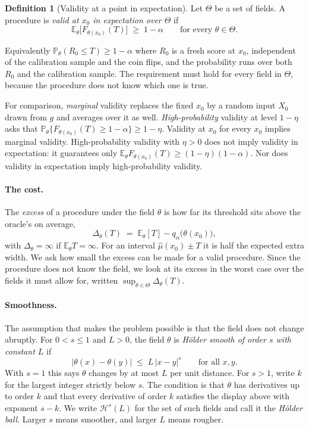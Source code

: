 \documentclass[11pt]{article}
\theoremstyle{definition}
\newtheorem{definition}[theorem]{Definition}
\theoremstyle{remark}
\newcommand{\E}{\mathbb{E}}
\newcommand{\Prob}{\mathbb{P}}
\begin{document}
\begin{definition}[Validity at a point in expectation]\label{def:valid}
Let $\Theta$ be a set of fields. A procedure is \emph{valid at $x_0$ in expectation over
$\Theta$} if
\begin{equation}\label{eq:valid}
  \E_\theta\big[F_{\theta(x_0)}(T)\big]\;\ge\;1-\alpha
  \qquad\text{for every }\theta\in\Theta .
\end{equation}
\end{definition}

Equivalently $\Prob_\theta(R_0\le T)\ge1-\alpha$ where $R_0$ is a fresh score at $x_0$,
independent of the calibration sample and the coin flips, and
the probability runs over both $R_0$ and the calibration sample. The requirement must hold
for every field in $\Theta$, because the procedure does not know which one is true.

For comparison, \emph{marginal} validity replaces the fixed $x_0$ by a random input $X_0$
drawn from $g$ and averages over it as well. \emph{High-probability} validity at level
$1-\eta$ asks that $\Prob_\theta\{F_{\theta(x_0)}(T)\ge1-\alpha\}\ge1-\eta$. Validity at
$x_0$ for every $x_0$ implies marginal validity. High-probability validity with $\eta>0$
does not imply validity in expectation: it guarantees only
$\E_\theta F_{\theta(x_0)}(T)\ge(1-\eta)(1-\alpha)$. Nor does validity in expectation imply
high-probability validity.

\paragraph{The cost.}
The \emph{excess} of a procedure under the field $\theta$ is how far its threshold sits
above the oracle's on average,
\[
  \Delta_\theta(T)\;=\;\E_\theta[T]-q_\alpha\big(\theta(x_0)\big),
\]
with $\Delta_\theta=\infty$ if $\E_\theta T=\infty$. For an interval $\hat\mu(x_0)\pm T$ it
is half the expected extra width. We ask how small the excess can be made for a valid
procedure. Since the procedure does not know the field, we look at its excess in the worst
case over the fields it must allow for, written $\sup_{\theta\in\Theta}\Delta_\theta(T)$.

\paragraph{Smoothness.}
The assumption that makes the problem possible is that the field does not change abruptly.
For $0<s\le1$ and $L>0$, the field $\theta$ is \emph{H\"older smooth of order $s$ with
constant $L$} if
\[
  |\theta(x)-\theta(y)|\;\le\;L\,|x-y|^{s}\qquad\text{for all }x,y .
\]
With $s=1$ this says $\theta$ changes by at most $L$ per unit distance. For $s>1$, write
$k$ for the largest integer strictly below $s$. The condition is that $\theta$ has
derivatives up to order $k$ and that every derivative of order $k$ satisfies the display
above with exponent $s-k$. We write $\mathcal H^s(L)$ for the set of such fields and call it
the \emph{H\"older ball}. Larger $s$ means smoother, and larger $L$ means rougher.
\end{document}
